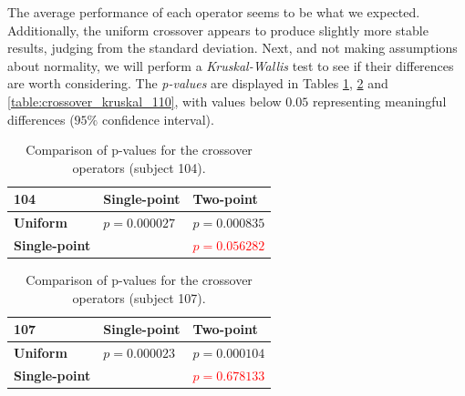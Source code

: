     The average performance of each operator seems to be what we expected. Additionally, the uniform crossover appears to produce slightly more stable results, judging from the standard deviation. Next, and not making assumptions about normality, we will perform a \textit{Kruskal-Wallis} test to see if their differences are worth considering. The \textit{p-values} are displayed in Tables \ref{table:crossover_kruskal_104}, \ref{table:crossover_kruskal_107} and \ref{table:crossover_kruskal_110}, with values below $0.05$ representing meaningful differences ($95\%$ confidence interval).

    \vspace{0.0cm}

	\begin{table}[h]

        \centering
        \setlength\arrayrulewidth{0.8pt}

        \begin{tabular}{| >{\centering\arraybackslash}m{0.9in} |  >{\centering\arraybackslash}m{0.9in} | >{\centering\arraybackslash}m{0.9in} |}

            \hline
            \rowcolor{RoyalBlue}
            \textbf{104} & \textbf{Single-point} & \textbf{Two-point} \\
            \hline
            \cellcolor{RoyalBlue}\textbf{Uniform} & $p = 0.000027$ & $p = 0.000835$ \\
            \hline
            \cellcolor{RoyalBlue}\textbf{Single-point} & \cellcolor{lightgray} & \textcolor{red}{$p = 0.056282$} \\
            \hline

        \end{tabular}

        \caption{Comparison of p-values for the crossover operators (subject 104).}\label{table:crossover_kruskal_104}

    \end{table}

    \begin{table}[h]

        \centering
        \setlength\arrayrulewidth{0.8pt}

        \begin{tabular}{| >{\centering\arraybackslash}m{0.9in} |  >{\centering\arraybackslash}m{0.9in} | >{\centering\arraybackslash}m{0.9in} |}

            \hline
            \rowcolor{RoyalBlue}
            \textbf{107} & \textbf{Single-point} & \textbf{Two-point} \\
            \hline
            \cellcolor{RoyalBlue}\textbf{Uniform} & $p = 0.000023$ & $p = 0.000104$ \\
            \hline
            \cellcolor{RoyalBlue}\textbf{Single-point} & \cellcolor{lightgray} & \textcolor{red}{$p = 0.678133$} \\
            \hline

        \end{tabular}

        \caption{Comparison of p-values for the crossover operators (subject 107).}\label{table:crossover_kruskal_107}

    \end{table}

